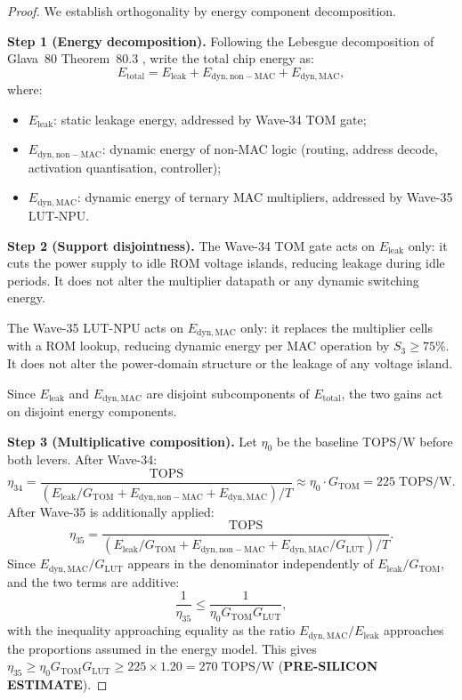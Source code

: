 \begin{proof}
We establish orthogonality by energy component decomposition.

\medskip
\noindent\textbf{Step 1 (Energy decomposition).}
Following the Lebesgue decomposition of Glava~80 Theorem~80.3
\cite{glava80_tom_layer_gate}, write the total chip energy as:
\[
  E_{\mathrm{total}} = E_{\mathrm{leak}} + E_{\mathrm{dyn, non-MAC}} + E_{\mathrm{dyn, MAC}},
\]
where:
\begin{itemize}
  \item $E_{\mathrm{leak}}$: static leakage energy, addressed by Wave-34 TOM gate;
  \item $E_{\mathrm{dyn, non-MAC}}$: dynamic energy of non-MAC logic (routing,
    address decode, activation quantisation, controller);
  \item $E_{\mathrm{dyn, MAC}}$: dynamic energy of ternary MAC multipliers,
    addressed by Wave-35 LUT-NPU.
\end{itemize}

\medskip
\noindent\textbf{Step 2 (Support disjointness).}
The Wave-34 TOM gate acts on $E_{\mathrm{leak}}$ only: it cuts the power
supply to idle ROM voltage islands, reducing leakage during idle periods.
It does not alter the multiplier datapath or any dynamic switching energy.

The Wave-35 LUT-NPU acts on $E_{\mathrm{dyn, MAC}}$ only: it replaces the
multiplier cells with a ROM lookup, reducing dynamic energy per MAC operation
by $S_3 \geq 75\%$.  It does not alter the power-domain structure or the
leakage of any voltage island.

Since $E_{\mathrm{leak}}$ and $E_{\mathrm{dyn, MAC}}$ are disjoint subcomponents
of $E_{\mathrm{total}}$, the two gains act on disjoint energy components.

\medskip
\noindent\textbf{Step 3 (Multiplicative composition).}
Let $\eta_0$ be the baseline TOPS/W before both levers.  After Wave-34:
\[
  \eta_{34} = \frac{\mathrm{TOPS}}{(E_{\mathrm{leak}}/G_{\mathrm{TOM}} + E_{\mathrm{dyn, non-MAC}} + E_{\mathrm{dyn, MAC}})/T}
  \approx \eta_0 \cdot G_{\mathrm{TOM}} = 225\;\mathrm{TOPS/W}.
\]
After Wave-35 is additionally applied:
\[
  \eta_{35} = \frac{\mathrm{TOPS}}{(E_{\mathrm{leak}}/G_{\mathrm{TOM}} + E_{\mathrm{dyn, non-MAC}} + E_{\mathrm{dyn, MAC}}/G_{\mathrm{LUT}})/T}.
\]
Since $E_{\mathrm{dyn, MAC}}/G_{\mathrm{LUT}}$ appears in the denominator independently
of $E_{\mathrm{leak}}/G_{\mathrm{TOM}}$, and the two terms are additive:
\[
  \frac{1}{\eta_{35}} \leq \frac{1}{\eta_0 G_{\mathrm{TOM}} G_{\mathrm{LUT}}},
\]
with the inequality approaching equality as the ratio $E_{\mathrm{dyn, MAC}} /
E_{\mathrm{leak}}$ approaches the proportions assumed in the energy model.
This gives $\eta_{35} \geq \eta_0 G_{\mathrm{TOM}} G_{\mathrm{LUT}} \geq 225 \times 1.20
= 270\;\mathrm{TOPS/W}$ (\textbf{PRE-SILICON ESTIMATE}).


\end{proof}
